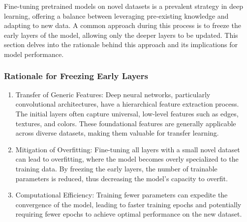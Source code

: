 \documentclass{article}
\begin{document}
Fine-tuning pretrained models on novel datasets is a prevalent strategy in deep learning, offering a balance between leveraging pre-existing knowledge and adapting to new data. A common approach during this process is to freeze the early layers of the model, allowing only the deeper layers to be updated. This section delves into the rationale behind this approach and its implications for model performance.

\subsubsection{Rationale for Freezing Early Layers}

\begin{enumerate}
\item Transfer of Generic Features: Deep neural networks, particularly convolutional architectures, have a hierarchical feature extraction process. The initial layers often capture universal, low-level features such as edges, textures, and colors. These foundational features are generally applicable across diverse datasets, making them valuable for transfer learning.

\item Mitigation of Overfitting: Fine-tuning all layers with a small novel dataset can lead to overfitting, where the model becomes overly specialized to the training data. By freezing the early layers, the number of trainable parameters is reduced, thus decreasing the model's capacity to overfit.

\item Computational Efficiency: Training fewer parameters can expedite the convergence of the model, leading to faster training epochs and potentially requiring fewer epochs to achieve optimal performance on the new dataset.
\end{enumerate}
\end{document}
